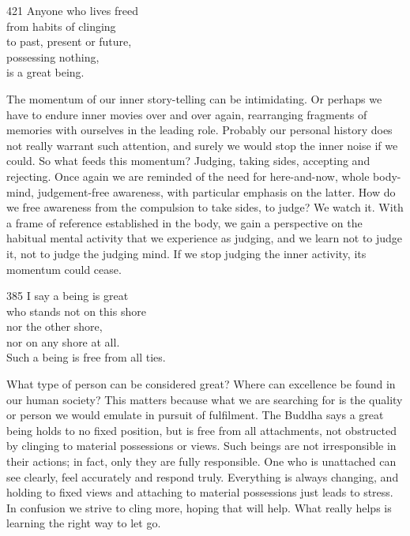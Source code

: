 
\begin{dhpVerse}{421}
\label{dhp-421}
Anyone who lives freed\\
from habits of clinging\\
to past, present or future,\\
possessing nothing,\\
is a great being.
\end{dhpVerse}

\begin{dhpRefl}
  The momentum of our inner story-telling can be intimidating. Or perhaps we
  have to endure inner movies over and over again, rearranging fragments of
  memories with ourselves in the leading role. Probably our personal history
  does not really warrant such attention, and surely we would stop the inner
  noise if we could. So what feeds this momentum? Judging, taking sides,
  accepting and rejecting. Once again we are reminded of the need for
  here-and-now, whole body-mind, judgement-free awareness, with particular
  emphasis on the latter. How do we free awareness from the compulsion to take
  sides, to judge? We watch it. With a frame of reference established in the
  body, we gain a perspective on the habitual mental activity that we experience
  as judging, and we learn not to judge it, not to judge the judging mind. If we
  stop judging the inner activity, its momentum could cease.
\end{dhpRefl}


\begin{dhpVerse}{385}
\label{dhp-385}
I say a being is great\\
who stands not on this shore\\
nor the other shore,\\
nor on any shore at all.\\
Such a being is free from all ties.
\end{dhpVerse}

\begin{dhpRefl}
  What type of person can be considered great? Where can excellence be found in
  our human society? This matters because what we are searching for is the
  quality or person we would emulate in pursuit of fulfilment. The Buddha says a
  great being holds to no fixed position, but is free from all attachments, not
  obstructed by clinging to material possessions or views. Such beings are not
  irresponsible in their actions; in fact, only they are fully responsible. One
  who is unattached can see clearly, feel accurately and respond truly.
  Everything is always changing, and holding to fixed views and attaching to
  material possessions just leads to stress. In confusion we strive to cling
  more, hoping that will help. What really helps is learning the right way to
  let go.
\end{dhpRefl}

